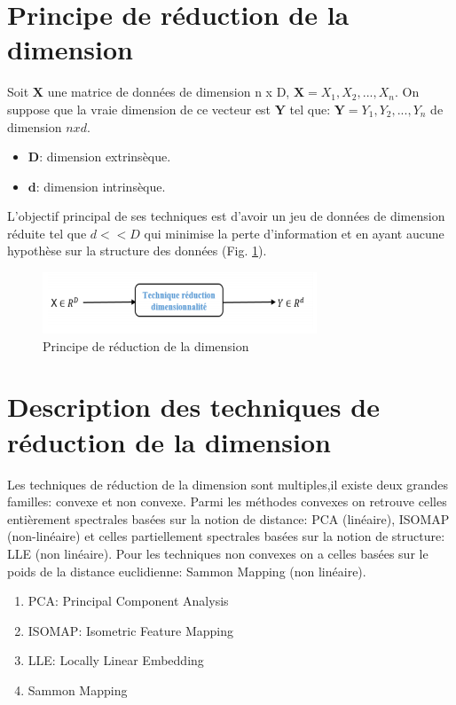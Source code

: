 \documentclass[twoside,twocolumn]{article}
\begin{document}

\section{Principe de réduction de la dimension}

Soit $\mathbf{X}$ une matrice de données de dimension n x D,
$\mathbf{X}=X_1,X_2, ... ,X_n$. On suppose que la vraie dimension de ce vecteur est $\mathbf Y$ tel que: $\mathbf{Y}=Y_1,Y_2, ..., Y_n$ de dimension $n x d$.

\begin{itemize}
\item $\mathbf D$: dimension extrinsèque.
\item $\mathbf d$: dimension intrinsèque.
\end{itemize}

L’objectif principal de ses techniques est d’avoir un jeu de données de dimension réduite tel que $ d < <  D$ qui minimise la perte d’information et en ayant aucune hypothèse sur la structure des données (Fig. \ref{prinp}). 
\begin{figure}[ht!]
  \centering
  \includegraphics[width= \linewidth]{01.png} 
  \vspace{-24pt}
  \caption{Principe de réduction de la dimension}
  \label{prinp}
\end{figure}

\section{Description des techniques de réduction de la dimension}

Les techniques de réduction de la dimension sont multiples,il existe deux grandes familles: convexe et non convexe. Parmi les méthodes convexes on retrouve celles entièrement spectrales basées sur la notion de distance: PCA (linéaire), ISOMAP (non-linéaire) et celles partiellement spectrales basées sur la notion de structure: LLE (non linéaire). Pour les techniques non convexes on a celles basées sur le poids de la distance euclidienne: Sammon Mapping (non linéaire).

\begin{enumerate}
\item PCA: Principal Component Analysis
\item ISOMAP: Isometric Feature Mapping
\item LLE: Locally Linear Embedding
\item Sammon Mapping
\end{enumerate}
\end{document}
